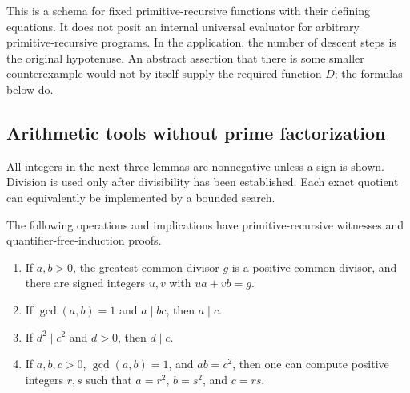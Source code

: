 This is a schema for fixed primitive-recursive functions with their defining
equations.  It does not posit an internal universal evaluator for arbitrary
primitive-recursive programs.  In the application, the number of descent steps
is the original hypotenuse.  An abstract assertion that there is some smaller
counterexample would not by itself supply the required function $D$; the
formulas below do.

\subsection{Arithmetic tools without prime factorization}

All integers in the next three lemmas are nonnegative unless a sign is shown.
Division is used only after divisibility has been established.  Each exact
quotient can equivalently be implemented by a bounded search.

\begin{lemma}\label{lem:descent-gcd}
The following operations and implications have primitive-recursive witnesses
and quantifier-free-induction proofs.
\begin{enumerate}
\item If $a,b>0$, the greatest common divisor $g$ is a positive common divisor,
and there are signed integers $u,v$ with $ua+vb=g$.
\item If $\gcd(a,b)=1$ and $a\mid bc$, then $a\mid c$.
\item If $d^2\mid c^2$ and $d>0$, then $d\mid c$.
\item If $a,b,c>0$, $\gcd(a,b)=1$, and $ab=c^2$, then one can compute
positive integers $r,s$ such that $a=r^2$, $b=s^2$, and $c=rs$.
\end{enumerate}
\end{lemma}

